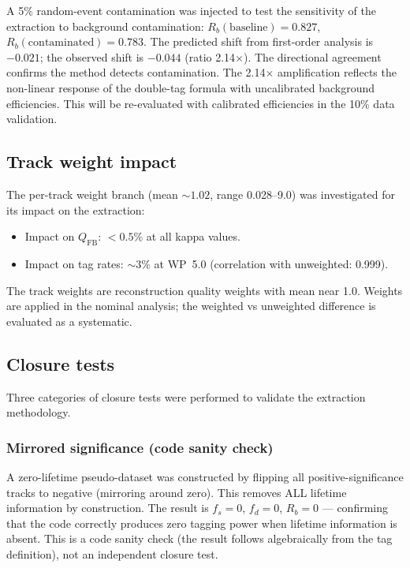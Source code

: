 \documentclass[11pt,a4paper]{article}
\begin{document}
A 5\% random-event contamination was injected to test the sensitivity of the
extraction to background contamination:
$R_b(\mathrm{baseline}) = 0.827$,
$R_b(\mathrm{contaminated}) = 0.783$.
The predicted shift from first-order analysis is $-0.021$; the observed shift is $-0.044$
(ratio 2.14$\times$). The directional agreement confirms the method detects contamination.
The 2.14$\times$ amplification reflects the non-linear response of the double-tag formula
with uncalibrated background efficiencies. This will be re-evaluated with calibrated
efficiencies in the 10\% data validation.

\subsection{Track weight impact}
\label{sec:xcheck_weights}

The per-track weight branch (mean $\sim 1.02$, range 0.028--9.0) was investigated for
its impact on the extraction:
\begin{itemize}
\item Impact on $Q_\mathrm{FB}$: $< 0.5\%$ at all kappa values.
\item Impact on tag rates: $\sim 3\%$ at WP~5.0 (correlation with unweighted: 0.999).
\end{itemize}
The track weights are reconstruction quality weights with mean near 1.0. Weights are
applied in the nominal analysis; the weighted vs unweighted difference is evaluated as
a systematic.

\subsection{Closure tests}
\label{sec:xcheck_closure}

Three categories of closure tests were performed to validate the extraction methodology.

\subsubsection{Mirrored significance (code sanity check)}

A zero-lifetime pseudo-dataset was constructed by flipping all positive-significance
tracks to negative (mirroring around zero). This removes ALL lifetime information by
construction. The result is $f_s = 0$, $f_d = 0$, $R_b = 0$ --- confirming that the
code correctly produces zero tagging power when lifetime information is absent. This is a
code sanity check (the result follows algebraically from the tag definition), not an
independent closure test.
\end{document}
